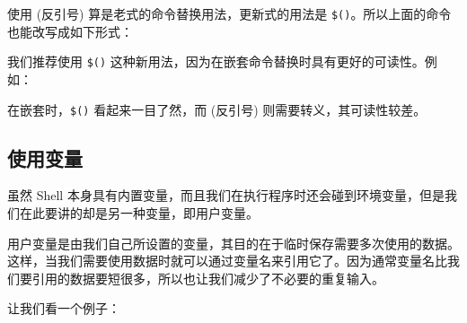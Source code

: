 \documentclass[]{ctexbook}
\newenvironment{Shaded}{\begin{snugshade}}{\end{snugshade}}
\newcommand{\DataTypeTok}[1]{\textcolor[rgb]{0.13,0.29,0.53}{#1}}
\newcommand{\ExtensionTok}[1]{#1}
\newcommand{\FunctionTok}[1]{\textcolor[rgb]{0.00,0.00,0.00}{#1}}
\newcommand{\KeywordTok}[1]{\textcolor[rgb]{0.13,0.29,0.53}{\textbf{#1}}}
\newcommand{\NormalTok}[1]{#1}
\newcommand{\StringTok}[1]{\textcolor[rgb]{0.31,0.60,0.02}{#1}}
\newcommand{\VariableTok}[1]{\textcolor[rgb]{0.00,0.00,0.00}{#1}}
\begin{document}
使用 \texttt{\textasciigrave{}\textasciigrave{}} (反引号) 算是老式的命令替换用法，更新式的用法是 \texttt{\$()}。所以上面的命令也能改写成如下形式：

\begin{Shaded}
\end{Shaded}

我们推荐使用 \texttt{\$()} 这种新用法，因为在嵌套命令替换时具有更好的可读性。例如：

\begin{Shaded}
\end{Shaded}

在嵌套时，\texttt{\$()} 看起来一目了然，而 \texttt{\textasciigrave{}\textasciigrave{}} (反引号) 则需要转义，其可读性较差。

\hypertarget{ux4f7fux7528ux53d8ux91cf}{%
\subsection{使用变量}\label{ux4f7fux7528ux53d8ux91cf}}

虽然 Shell 本身具有内置变量，而且我们在执行程序时还会碰到环境变量，但是我们在此要讲的却是另一种变量，即用户变量。

用户变量是由我们自己所设置的变量，其目的在于临时保存需要多次使用的数据。这样，当我们需要使用数据时就可以通过变量名来引用它了。因为通常变量名比我们要引用的数据要短很多，所以也让我们减少了不必要的重复输入。

让我们看一个例子：

\begin{Shaded}
\end{Shaded}
\end{document}
